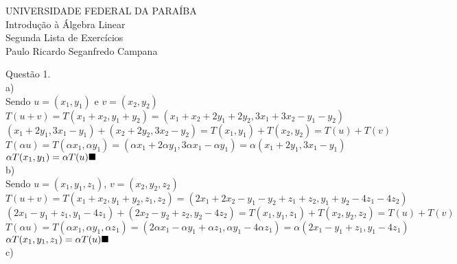 \documentclass[12pt]{article}
\begin{document}
\begin{center}
	UNIVERSIDADE FEDERAL DA PARAÍBA\\
	Introdução à Álgebra Linear\\
	Segunda Lista de Exercícios\\
	Paulo Ricardo Seganfredo Campana\\
\end{center}

\noindent Questão 1.\\

\noindent a)\\

Sendo $u=(x_{1},y_{1})$ e $v=(x_{2},y_{2})$\\

$T(u+v)=T(x_{1}+x_{2},y_{1}+y_{2})=(x_{1}+x_{2}+2y_{1}+2y_{2},3x_{1}+3x_{2}-y_{1}-y_{2})$\\

$(x_{1}+2y_{1},3x_{1}-y_{1})+(x_{2}+2y_{2},3x_{2}-y_{2})=T(x_{1},y_{1})+T(x_{2},y_{2})=T(u)+T(v)$\\

$T(\alpha u)=T(\alpha x_{1}, \alpha y_{1})=(\alpha x_{1}+2\alpha y_{1},3\alpha x_{1}-\alpha y_{1})=\alpha(x_{1}+2y_{1},3x_{1}-y_{1})$\\

$\alpha T(x_{1},y_{1})=\alpha T(u)\hfill\blacksquare$\\

\noindent b)\\

Sendo $u=(x_{1},y_{1},z_{1})$, $v=(x_{2},y_{2},z_{2})$\\

$T(u+v)=T(x_{1}+x_{2},y_{1}+y_{2},z_{1},z_{2})=(2x_{1}+2x_{2}-y_{1}-y_{2}+z_{1}+z_{2},y_{1}+y_{2}-4z_{1}-4z_{2})$\\

$(2x_{1}-y_{1}+z_{1},y_{1}-4z_{1})+(2x_{2}-y_{2}+z_{2},y_{2}-4z_{2})=T(x_{1},y_{1},z_{1})+T(x_{2},y_{2},z_{2})=T(u)+T(v)$\\

$T(\alpha u)=T(\alpha x_{1},\alpha y_{1},\alpha z_{1})=(2\alpha x_{1}-\alpha y_{1}+\alpha z_{1},\alpha y_{1}-4\alpha z_{1})=\alpha(2x_{1}-y_{1}+z_{1},y_{1}-4z_{1})$\\

$\alpha T(x_{1},y_{1},z_{1})=\alpha T(u)\hfill\blacksquare$\\

\noindent c)\\
\end{document}

